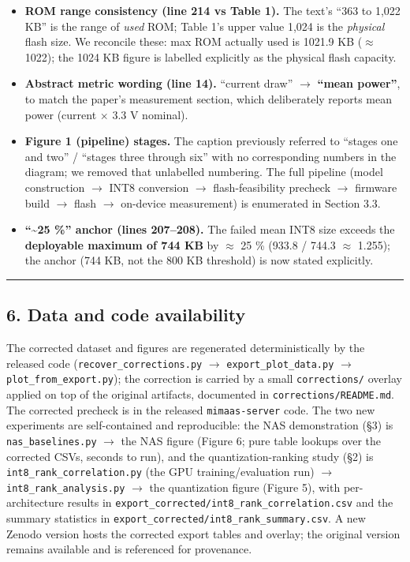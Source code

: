 \documentclass[11pt]{article}
\begin{document}
\begin{itemize}\setlength{\itemsep}{2pt}
\item \textbf{ROM range consistency (line 214 vs Table 1).} The text's ``363 to 1,022 KB'' is the range of \textit{used} ROM; Table 1's upper value 1,024 is the \textit{physical} flash size. We reconcile these: max ROM actually used is 1021.9 KB ($\approx$ 1022); the 1024 KB figure is labelled explicitly as the physical flash capacity.
\item \textbf{Abstract metric wording (line 14).} ``current draw'' $\to$ \textbf{``mean power''}, to match the paper's measurement section, which deliberately reports mean power (current $\times$ 3.3 V nominal).
\item \textbf{Figure 1 (pipeline) stages.} The caption previously referred to ``stages one and two'' / ``stages three through six'' with no corresponding numbers in the diagram; we removed that unlabelled numbering. The full pipeline (model construction $\to$ INT8 conversion $\to$ flash-feasibility precheck $\to$ firmware build $\to$ flash $\to$ on-device measurement) is enumerated in Section 3.3.
\item \textbf{``\textasciitilde{}25 \%'' anchor (lines 207--208).} The failed mean INT8 size exceeds the \textbf{deployable maximum of 744 KB} by $\approx$ 25 \% (933.8 / 744.3 $\approx$ 1.255); the anchor (744 KB, not the 800 KB threshold) is now stated explicitly.
\end{itemize}

\vspace{2pt}\hrule\vspace{6pt}

\subsection*{6. Data and code availability}

The corrected dataset and figures are regenerated deterministically by the released code (\texttt{recover\_\allowbreak{}corrections.py} $\to$ \texttt{export\_\allowbreak{}plot\_\allowbreak{}data.py} $\to$ \texttt{plot\_\allowbreak{}from\_\allowbreak{}export.py}); the correction is carried by a small \texttt{corrections/\allowbreak{}} overlay applied on top of the original artifacts, documented in \texttt{corrections/\allowbreak{}README.md}. The corrected precheck is in the released \texttt{mimaas-server} code. The two new experiments are self-contained and reproducible: the NAS demonstration (\S{}3) is \texttt{nas\_\allowbreak{}baselines.py} $\to$ the NAS figure (Figure 6; pure table lookups over the corrected CSVs, seconds to run), and the quantization-ranking study (\S{}2) is \texttt{int8\_\allowbreak{}rank\_\allowbreak{}correlation.py} (the GPU training/evaluation run) $\to$ \texttt{int8\_\allowbreak{}rank\_\allowbreak{}analysis.py} $\to$ the quantization figure (Figure 5), with per-architecture results in \texttt{export\_\allowbreak{}corrected/\allowbreak{}int8\_\allowbreak{}rank\_\allowbreak{}correlation.csv} and the summary statistics in \texttt{export\_\allowbreak{}corrected/\allowbreak{}int8\_\allowbreak{}rank\_\allowbreak{}summary.csv}. A new Zenodo version hosts the corrected export tables and overlay; the original version remains available and is referenced for provenance.
\end{document}
